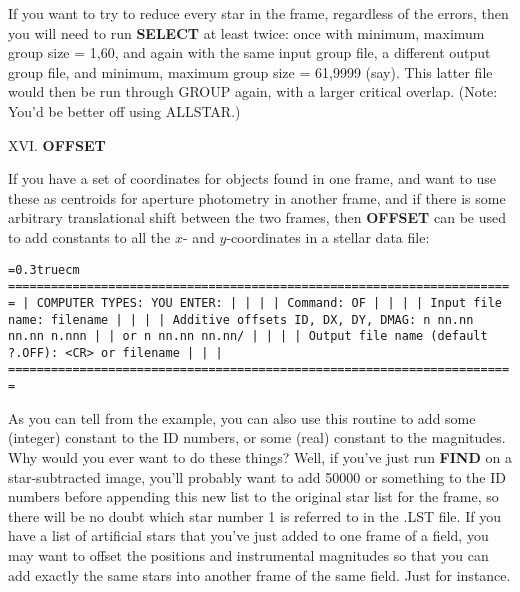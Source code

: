 \noindent If you want to try to reduce every star in the frame,
regardless of the errors, then you will need to run {\bf SELECT} at
least twice:  once with minimum, maximum group size = 1,60, and again
with the same input group file, a different output group file, and
minimum, maximum group size = 61,9999 (say).  This latter file would
then be run through GROUP again, with a larger critical overlap.  (Note:
You'd be better off using ALLSTAR.)

\vfill
\eject
\noindent XVI.  {\bf OFFSET}

If you have a set of coordinates for objects found in one frame,
and want to use these as centroids for aperture photometry in another
frame, and if there is some arbitrary translational shift between the
two frames, then {\bf OFFSET} can be used to add constants to all the
$x$- and $y$-coordinates in a stellar data file:

\bigskip
{\noindent\obeylines\obeyspaces\frenchspacing\tt\baselineskip=0.3truecm
=======================================================================
| COMPUTER TYPES:                               YOU ENTER:            |
|                                                                     |
| Command:                                      OF                    |
|                                                                     |
|                    Input file name:           filename              |
|                                                                     |
|  Additive offsets ID, DX, DY, DMAG:           n nn.nn nn.nn n.nnn   |
|                                            or n nn.nn nn.nn/        |
|                                                                     |
|   Output file name (default ?.OFF):           <CR> or filename      |
|                                                                     |
=======================================================================
}
\bigskip

\noindent As you can tell from the example, you can also use this
routine to add some (integer) constant to the ID numbers, or some
(real) constant to the magnitudes.  Why would you ever want to do these
things?  Well, if you've just run {\bf FIND} on a star-subtracted
image, you'll probably want to add 50000 or something to the ID numbers
before appending this new list to the original star list for the frame,
so there will be no doubt which star number 1 is referred to in the
.LST file.  If you have a list of artificial stars that you've just
added to one frame of a field, you may want to offset the positions and
instrumental magnitudes so that you can add exactly the same stars into
another frame of the same field.  Just for instance.

